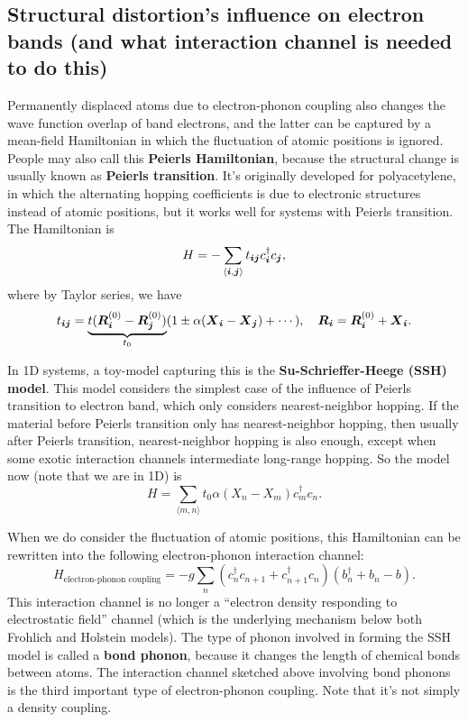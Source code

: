 \documentclass[hyperref, a4paper]{article}
\newcommand*{\pair}[1]{\langle #1 \rangle}
\newcommand*{\concept}[1]{{\textbf{#1}}}
\begin{document}
\subsection{Structural distortion's influence on electron bands (and what interaction channel is needed to do this)}

Permanently displaced atoms due to electron-phonon coupling 
also changes the wave function overlap of band electrons,
and the latter can be captured by a mean-field Hamiltonian 
in which the fluctuation of atomic positions is ignored.
People may also call this \concept{Peierls Hamiltonian},
because the structural change is usually known as 
\concept{Peierls transition}.
It's originally developed for polyacetylene,
in which the alternating hopping coefficients 
is due to electronic structures instead of atomic positions,
but it works well for systems with Peierls transition.
The Hamiltonian is 
\begin{equation}
    H = - \sum_{\pair{\vb*{i}, \vb*{j}}} 
    t_{\vb*{i} \vb*{j}} c^\dagger_{\vb*{i}} c_{\vb*{j}},
\end{equation}
where by Taylor series, we have
\begin{equation}
    t_{\vb*{i} \vb*{j}} = \underbrace{t(\vb*{R}_{\vb*{i}}^{(0)} - \vb*{R}^{(0)}_{\vb*{j}})}_{t_0} 
    (1 \pm \alpha (\vb*{X}_{\vb*{i}} - \vb*{X}_{\vb*{j}}) + \cdots),
    \quad \vb*{R}_{\vb*{i}} = \vb*{R}^{(0)}_{\vb*{i}} + \vb*{X}_{\vb*{i}}.
\end{equation}

In 1D systems, a toy-model capturing this is the 
\concept{Su-Schrieffer-Heege (SSH) model}.
This model considers the simplest case of the influence of Peierls transition to electron band,
which only considers nearest-neighbor hopping.
If the material before Peierls transition only has nearest-neighbor hopping, 
then usually after Peierls transition, 
nearest-neighbor hopping is also enough,
except when some exotic interaction channels 
intermediate long-range hopping.
So the model now (note that we are in 1D) is 
\begin{equation}
    H = \sum_{\pair{m, n}} t_0 \alpha (X_{n} - X_m) c^\dagger_m c_n.
\end{equation}

When we do consider the fluctuation of atomic positions,
this Hamiltonian can be rewritten into the following electron-phonon interaction channel:
\begin{equation}
    H_{\text{electron-phonon coupling}}
    = - g \sum_{n} (c^\dagger_n c_{n+1} + c^\dagger_{n+1} c_n) (b^\dagger_{n} + b_n - b).
\end{equation}
This interaction channel is no longer 
a ``electron density responding to electrostatic field'' channel
(which is the underlying mechanism below both Frohlich and Holstein models).
The type of phonon involved in forming the SSH model 
is called a \concept{bond phonon},
because it changes the length of chemical bonds between atoms.
The interaction channel sketched above involving bond phonons 
is the third important type of electron-phonon coupling.
Note that it's not simply a density coupling.
\end{document}

